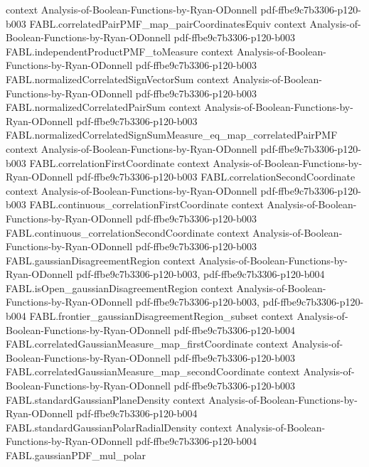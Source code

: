 \begin{theorem}
  {context}
  {Analysis-of-Boolean-Functions-by-Ryan-ODonnell}
  {pdf-ffbe9c7b3306-p120-b003}
\proofstep
  {FABL.correlatedPairPMF_map_pairCoordinatesEquiv}
  {context}
  {Analysis-of-Boolean-Functions-by-Ryan-ODonnell}
  {pdf-ffbe9c7b3306-p120-b003}
\proofstep
  {FABL.independentProductPMF_toMeasure}
  {context}
  {Analysis-of-Boolean-Functions-by-Ryan-ODonnell}
  {pdf-ffbe9c7b3306-p120-b003}
\proofstep
  {FABL.normalizedCorrelatedSignVectorSum}
  {context}
  {Analysis-of-Boolean-Functions-by-Ryan-ODonnell}
  {pdf-ffbe9c7b3306-p120-b003}
\proofstep
  {FABL.normalizedCorrelatedPairSum}
  {context}
  {Analysis-of-Boolean-Functions-by-Ryan-ODonnell}
  {pdf-ffbe9c7b3306-p120-b003}
\proofstep
  {FABL.normalizedCorrelatedSignSumMeasure_eq_map_correlatedPairPMF}
  {context}
  {Analysis-of-Boolean-Functions-by-Ryan-ODonnell}
  {pdf-ffbe9c7b3306-p120-b003}
\proofstep
  {FABL.correlationFirstCoordinate}
  {context}
  {Analysis-of-Boolean-Functions-by-Ryan-ODonnell}
  {pdf-ffbe9c7b3306-p120-b003}
\proofstep
  {FABL.correlationSecondCoordinate}
  {context}
  {Analysis-of-Boolean-Functions-by-Ryan-ODonnell}
  {pdf-ffbe9c7b3306-p120-b003}
\proofstep
  {FABL.continuous_correlationFirstCoordinate}
  {context}
  {Analysis-of-Boolean-Functions-by-Ryan-ODonnell}
  {pdf-ffbe9c7b3306-p120-b003}
\proofstep
  {FABL.continuous_correlationSecondCoordinate}
  {context}
  {Analysis-of-Boolean-Functions-by-Ryan-ODonnell}
  {pdf-ffbe9c7b3306-p120-b003}
\proofstep
  {FABL.gaussianDisagreementRegion}
  {context}
  {Analysis-of-Boolean-Functions-by-Ryan-ODonnell}
  {pdf-ffbe9c7b3306-p120-b003,
    pdf-ffbe9c7b3306-p120-b004}
\proofstep
  {FABL.isOpen_gaussianDisagreementRegion}
  {context}
  {Analysis-of-Boolean-Functions-by-Ryan-ODonnell}
  {pdf-ffbe9c7b3306-p120-b003,
    pdf-ffbe9c7b3306-p120-b004}
\proofstep
  {FABL.frontier_gaussianDisagreementRegion_subset}
  {context}
  {Analysis-of-Boolean-Functions-by-Ryan-ODonnell}
  {pdf-ffbe9c7b3306-p120-b004}
\proofstep
  {FABL.correlatedGaussianMeasure_map_firstCoordinate}
  {context}
  {Analysis-of-Boolean-Functions-by-Ryan-ODonnell}
  {pdf-ffbe9c7b3306-p120-b003}
\proofstep
  {FABL.correlatedGaussianMeasure_map_secondCoordinate}
  {context}
  {Analysis-of-Boolean-Functions-by-Ryan-ODonnell}
  {pdf-ffbe9c7b3306-p120-b003}
\proofstep
  {FABL.standardGaussianPlaneDensity}
  {context}
  {Analysis-of-Boolean-Functions-by-Ryan-ODonnell}
  {pdf-ffbe9c7b3306-p120-b004}
\proofstep
  {FABL.standardGaussianPolarRadialDensity}
  {context}
  {Analysis-of-Boolean-Functions-by-Ryan-ODonnell}
  {pdf-ffbe9c7b3306-p120-b004}
\proofstep
  {FABL.gaussianPDF_mul_polar}

\end{theorem}
